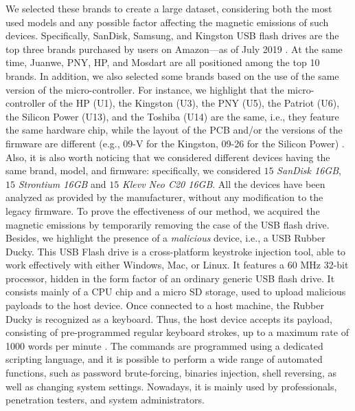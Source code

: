 \documentclass[acmsmall, authorversion]{acmart}
\begin{document}
\begin{itemize}
\begin{table}[htbp]
\begin{tabular}{|l|l|l|}
\end{tabular}
\label{tab:usblist}
\end{table}
We selected these brands to create a large dataset, considering both the most used models and any possible factor affecting the magnetic emissions of such devices. Specifically, SanDisk, Samsung, and Kingston USB flash drives are the top three brands purchased by users on Amazon---as of July 2019 \cite{AmazonList}. At the same time, Juanwe, PNY, HP, and Mosdart are all positioned among the top 10 brands. 
In addition, we also selected some brands based on the use of the same version of the micro-controller. For instance, we highlight that the micro-controller of the HP (U1), the Kingston (U3), the PNY (U5), the Patriot (U6), the Silicon Power (U13), and the Toshiba (U14) are the same, i.e., they feature the same hardware chip, while the layout of the \ac{PCB} and/or the versions of the firmware are different (e.g., 09-V for the Kingston, 09-26 for the Silicon Power) \cite{phison}. Also, it is also worth noticing that we considered different devices having the same brand, model, and firmware: specifically, we considered $15$ \emph{SanDisk 16GB}, $15$ \emph{Strontium 16GB} and $15$ \emph{Klevv Neo C20 16GB}.
All the devices have been analyzed as provided by the manufacturer, without any modification to the legacy firmware. To prove the effectiveness of our method, we acquired the magnetic emissions by temporarily removing the case of the USB flash drive. %
Besides, we highlight the presence of a \emph{malicious} device, i.e., a USB Rubber Ducky. This USB Flash drive is a cross-platform keystroke injection tool, able to work effectively with either Windows, Mac, or Linux. It features a 60 MHz 32-bit processor, hidden in the form factor of an ordinary generic USB flash drive. It consists mainly of a CPU chip and a micro SD storage, used to upload malicious payloads to the host device. 
Once connected to a host machine, the Rubber Ducky is recognized as a keyboard. Thus, the host device accepts its payload, consisting of pre-programmed regular keyboard strokes, up to a maximum rate of 1000 words per minute \cite{RubberDucky}. The commands are programmed using a dedicated scripting language, and it is possible to perform a wide range of automated functions, such as password brute-forcing, binaries injection, shell reversing, as well as changing system settings. Nowadays, it is mainly used by professionals, penetration testers, and system administrators.
    

\end{itemize}
\end{document}
